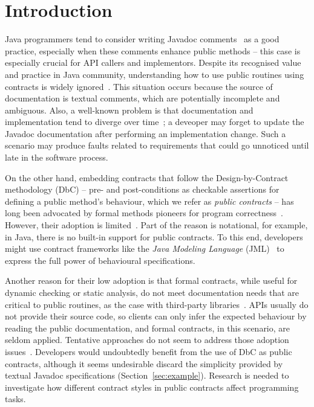 \section{Introduction}
\label{sec:introduction}

Java programmers tend to consider writing Javadoc comments~\cite{javadoc-oracle} as a good practice,
especially when these comments enhance public methods -- this case is especially crucial for API callers and implementors. Despite its recognised value and practice in Java community, understanding how to use public routines using contracts is widely ignored~\cite{liveAPI}.
This situation occurs because the source of documentation is textual comments, which are potentially incomplete and ambiguous. Also, a well-known problem is that documentation and implementation tend to diverge over time~\cite{Estler-etal14}; 
a deveoper may forget to update the Javadoc documentation after performing an implementation change. Such a scenario may produce faults related to requirements that could go unnoticed until late in the software process.

On the other hand, embedding contracts that follow the Design-by-Contract methodology (DbC) -- pre- and post-conditions as checkable assertions for defining a public method's behaviour, which we refer as \emph{public contracts} -- has
long been advocated by formal methods pioneers for program correctness~\cite{Hoare1969,Parnas2011}. 
However, their adoption is limited~\cite{Polikarpova-etal09}. 
Part of the reason is notational, for example, in Java, there is no built-in support for public contracts.
To this end, developers might use contract frameworks like the \emph{Java Modeling Language} (JML)~\cite{jml} to express the full power of behavioural specifications.

Another reason for their low adoption is that formal contracts, while useful for dynamic checking or static analysis, do not meet documentation needs that are critical to public routines, as the case with third-party libraries~\cite{Leavens10,Parnas2011}.
APIs usually do not provide their source code, so clients can only infer the expected behaviour by reading the public documentation, and formal contracts, in this scenario, are seldom applied.
Tentative approaches do not seem to address those adoption issues~\cite{docAnalysis}.
Developers would undoubtedly benefit from the use of DbC as public contracts, although it seems undesirable discard the simplicity provided by textual Javadoc specifications (Section~\ref{sec:example}).
Research is needed to investigate how different contract styles in public contracts affect programming tasks.

